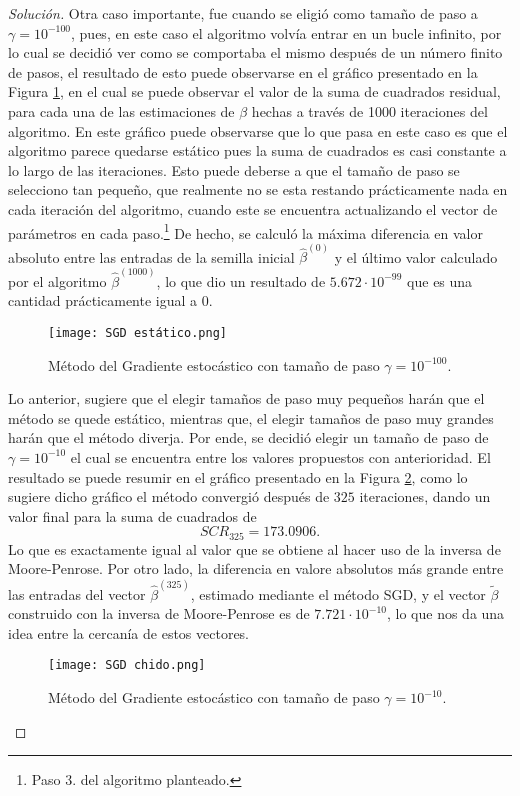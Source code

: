 \documentclass[10.5pt,notitlepage]{article}
\newenvironment{solucion}
  {\begin{proof}[Solución]}
  {\end{proof}}
\theoremstyle{plain}
\begin{document}
\begin{solucion}
Otra caso importante, fue cuando se eligió como tamaño de paso a \(\gamma = 10^{-100}\), pues, en este caso el algoritmo volvía entrar en un bucle infinito, por lo cual se decidió ver como se comportaba el mismo después de un número finito de pasos, el resultado de esto puede observarse en el gráfico presentado en la Figura \ref{fig:2}, en el cual se puede observar el valor de la suma de cuadrados residual, para cada una de las estimaciones de \(\beta\) hechas a través de 1000 iteraciones del algoritmo. En este gráfico puede observarse que lo que pasa en este caso es que el algoritmo parece quedarse estático pues la suma de cuadrados es casi constante a lo largo de las iteraciones. Esto puede deberse a que el tamaño de paso se selecciono tan pequeño, que realmente no se esta restando prácticamente nada en cada iteración del algoritmo, cuando este se encuentra actualizando el vector de parámetros en cada paso.\footnote{Paso \(3.\) del algoritmo planteado.} De hecho, se calculó la máxima diferencia en valor absoluto entre las entradas de la semilla inicial \(\hat{\beta}^{(0)}\) y el último valor calculado por el algoritmo \(\hat{\beta}^{(1000)}\), lo que dio un resultado de \(5.672\cdot10^{-99}\) que es una cantidad prácticamente igual a \(0\). 
\begin{figure}[htb]
    \centering
    \texttt{[image: SGD estático.png]}
    \caption{Método del Gradiente estocástico con tamaño de paso \(\gamma = 10^{-100}\).}
    \label{fig:2}
\end{figure}
Lo anterior, sugiere que el elegir tamaños de paso muy pequeños harán que el método se quede estático, mientras que, el elegir tamaños de paso muy grandes harán que el método diverja. Por ende, se decidió elegir un tamaño de paso de \(\gamma = 10^{-10}\) el cual se encuentra entre los valores propuestos con anterioridad. El resultado se puede resumir en el gráfico presentado en la Figura \ref{fig:3}, como lo sugiere dicho gráfico el método convergió después de \(325\) iteraciones, dando un valor final para la suma de cuadrados de 
\[
SCR_{325} =  173.0906.
\]
Lo que es exactamente igual al valor que se obtiene al hacer uso de la inversa de Moore-Penrose. Por otro lado, la diferencia en valore absolutos más grande entre las entradas del vector \(\hat{\beta}^{(325)}\), estimado mediante el método SGD, y el vector \(\widetilde{\beta}\) construido con la inversa de Moore-Penrose es de \(7.721\cdot 10^{-10}\), lo que nos da una idea entre la cercanía de estos vectores.   
\begin{figure}[htb]
    \centering
    \texttt{[image: SGD chido.png]}
    \caption{Método del Gradiente estocástico con tamaño de paso \(\gamma = 10^{-10}\).}
    \label{fig:3}
\end{figure}
\end{solucion}
\end{document}
